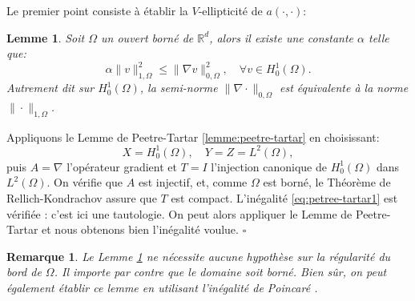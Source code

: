 \documentclass[11pt]{book}
\newtheorem{lemma}[theorem]{Lemme}
\newtheorem{remark}[theorem]{Remarque}
\newcommand{\br}{\begin{remark}}
\newcommand{\er}{\end{remark}}
\newcommand{\bl}{\begin{lemma}}
\newcommand{\el}{\end{lemma}}
\newcommand{\cqfd}{{$\mbox{}$\hfill$\square$}}
\newcommand{\R}{\mathbb{R}}
\begin{document}
\medskip

Le premier point consiste à établir la $V$-ellipticité de $a(\cdot,\cdot)$:
%
\bl %
\label{lem:poincare} Soit $\Omega$ un ouvert borné de $\R^d$, alors il existe une constante $\alpha$ %
 telle que:
\[
 \alpha \| v \|_{1,\Omega}^2 \leq \| \nabla v \|_{0,\Omega}^2, \quad \forall v \in H^1_0(\Omega).
\]
Autrement dit sur $H^1_0(\Omega)$, la semi-norme $\|\nabla \cdot \|_{0,\Omega}$ est équivalente à la norme $\|\cdot\|_{1,\Omega}$.
\el

\proof 
Appliquons le Lemme de Peetre-Tartar \ref{lemme:peetre-tartar} en choisissant:
\[
 X = H^1_0(\Omega), \quad Y = Z = L^2(\Omega),
\]
puis $A = \nabla$ l'opérateur gradient et $T = I$ l'injection canonique de $H^1_0(\Omega)$ dans $L^2(\Omega)$.
On vérifie que $A$ est injectif, et, comme $\Omega$ est borné, le Théorème de Rellich-Kondrachov assure que $T$ est compact. L'inégalité \eqref{eq:petree-tartar1} est vérifiée : c'est ici une tautologie. On peut alors appliquer le Lemme de Peetre-Tartar et nous obtenons bien l'inégalité voulue.
\cqfd


\br %
Le Lemme \ref{lem:poincare} ne nécessite aucune hypothèse sur la régularité du bord de $\Omega$. Il importe par contre que le domaine soit borné. 
Bien sûr, on peut également établir ce lemme en utilisant l'inégalité de Poincaré \cite[Lemma B.61]{ern-guermond-04}.
\er %

\end{document}
